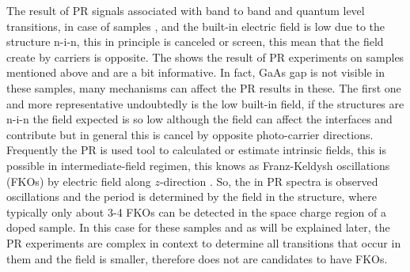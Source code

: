 The result of PR signals associated with band to band and quantum level transitions, in case of samples ,  and  the built-in electric field is low due to the structure n-i-n, this in principle is canceled or screen, this mean that  the field create by carriers is opposite. The  shows the result of PR experiments on samples mentioned above and are a bit informative. In fact, GaAs gap is not visible in these samples, many mechanisms can affect the PR results in these. The first one and more representative  undoubtedly is the low built-in field, if the structures are n-i-n the field expected is so low although the field can affect the interfaces and contribute but in general this is cancel by opposite photo-carrier directions. Frequently the PR is used tool to calculated or estimate intrinsic fields, this is possible in intermediate-field regimen, this knows as Franz-Keldysh oscillations  (FKOs) by electric field along $z$-direction \cite{shen1995franz}. So, the in PR spectra is observed oscillations and the period is determined by the field in the structure, where typically only about 3-4 FKOs can be detected in the space charge region of a doped sample. In this case for these samples and as will be explained later, the PR experiments are complex in context to determine all transitions  that occur in them and the field is smaller, therefore does not are candidates to have FKOs.

